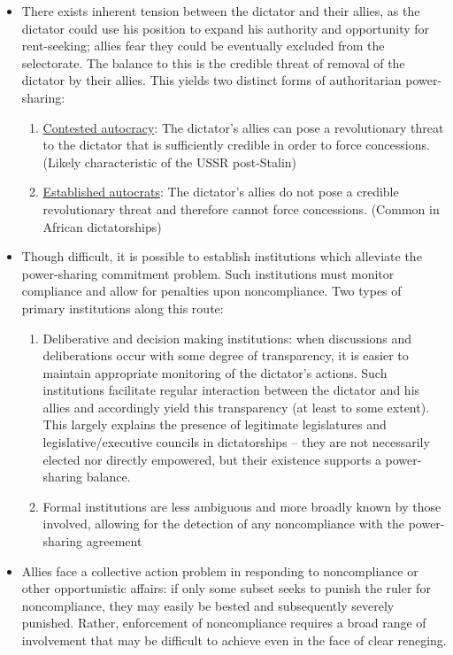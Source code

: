 \documentclass[12pt]{article}
\begin{document}
\begin{itemize}[leftmargin=*, itemsep=4pt]
\begin{enumerate}
        \item Concentration of power with the dictator
        \item Personalization of political interactions
    \end{enumerate}
    \item There exists inherent tension between the dictator and their allies, as the dictator could use his position to expand his authority and opportunity for rent-seeking; allies fear they could be eventually excluded from the selectorate. The balance to this is the credible threat of removal of the dictator by their allies. This yields two distinct forms of authoritarian power-sharing:
    \begin{enumerate}
        \item \underline{Contested autocracy}: The dictator's allies can pose a revolutionary threat to the dictator that is sufficiently credible in order to force concessions. (Likely characteristic of the USSR post-Stalin)
        \item \underline{Established autocrats}: The dictator's allies do not pose a credible revolutionary threat and therefore cannot force concessions. (Common in African dictatorships)
    \end{enumerate}
    \item Though difficult, it is possible to establish institutions which alleviate the power-sharing commitment problem. Such institutions must monitor compliance and allow for penalties upon noncompliance. Two types of primary institutions along this route:
    \begin{enumerate}
        \item Deliberative and decision making institutions: when discussions and deliberations occur with some degree of transparency, it is easier to maintain appropriate monitoring of the dictator's actions. Such institutions facilitate regular interaction between the dictator and his allies and accordingly yield this transparency (at least to some extent). This largely explains the presence of legitimate legislatures and legislative/executive councils in dictatorships -- they are not necessarily elected nor directly empowered, but their existence supports a power-sharing balance.
        \item Formal institutions are less ambiguous and more broadly known by those involved, allowing for the detection of any noncompliance with the power-sharing agreement
    \end{enumerate}
    \item Allies face a collective action problem in responding to noncompliance or other opportunistic affairs: if only some subset seeks to punish the ruler for noncompliance, they may easily be bested and subsequently severely punished. Rather, enforcement of noncompliance requires a broad range of involvement that may be difficult to achieve even in the face of clear reneging.

\end{itemize}
\end{document}
